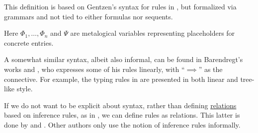 \begin{comments}
  \item This definition is based on Gentzen's syntax for rules in \cite[181]{Gentzen1935LogischeSchließen}, but formalized via grammars and not tied to either formulas nor sequents.

  \item Here \( \Phi_1, \ldots, \Phi_n \) and \( \Psi \) are metalogical variables representing placeholders for concrete entries.

  \item A somewhat similar syntax, albeit also informal, can be found in Barendregt's works \cite{Barendregt1984LambdaCalculus} and \cite{Barendregt1992LambdaCalculiWithTypes}, who expresses some of his rules linearly, with \enquote{\( {\implies} \)} as the connective. For example, the typing rules in \cite[def. 3.1.3]{Barendregt1992LambdaCalculiWithTypes} are presented in both linear and tree-like style.

  \item If we do not want to be explicit about syntax, rather than defining \hyperref[def:relation]{relations} based on inference rules, as in , we can define rules as relations. This latter is done by \textcite[def. 1.2.2]{Герасимов2014Вычислимость} and \textcite[115]{CitkinMuravitsky2022ConsequenceRelations}. Other authors only use the notion of inference rules informally.
\end{comments}


